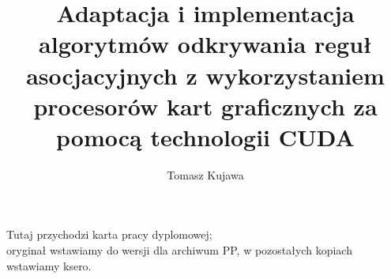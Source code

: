 \documentclass[polish,a4paper,oneside]{ppfcmthesis}
\author{Tomasz Kujawa}                              %
\title{Adaptacja i implementacja algorytmów odkrywania reguł asocjacyjnych z wykorzystaniem procesorów kart graficznych za pomocą technologii CUDA}                   %
\theoremstyle{definition}
\begin{document}
\frontmatter\pagestyle{empty}%
\maketitle\cleardoublepage%

\thispagestyle{empty}\vspace*{\fill}%
\begin{center}Tutaj przychodzi karta pracy dyplomowej;\\oryginał wstawiamy do wersji dla archiwum PP, w pozostałych kopiach wstawiamy ksero.\end{center}%
\vfill\cleardoublepage%

\pagestyle{ppfcmthesis}%
\tableofcontents* \cleardoublepage%

\mainmatter%








%
%

{\raggedright\sloppy\small}

\ppcolophon
\end{document}
